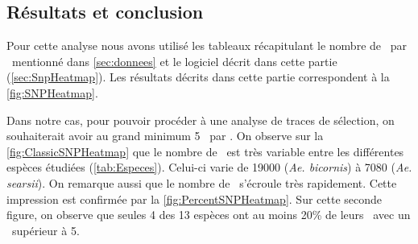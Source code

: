 \documentclass[../main]{subfiles} %
\begin{document}
\subsection{Résultats et conclusion}
\label{sec:SNP_Results}
Pour cette analyse nous avons utilisé les tableaux récapitulant le nombre de \SNP par \contig mentionné dans \ref{sec:donnees} et le logiciel décrit dans cette partie (\cref{sec:SnpHeatmap}). Les résultats décrits dans cette partie correspondent à la \cref{fig:SNPHeatmap}.

Dans notre cas, pour pouvoir procéder à une analyse de  traces de sélection, on souhaiterait avoir au grand minimum 5 \SNP par \contigs.
On observe sur la \cref{fig:ClassicSNPHeatmap} que le nombre de \contigs est très variable entre les différentes espèces étudiées (\ref{tab:Especes}). Celui-ci varie de \num{19 000} (\textit{Ae. bicornis}) à \num{7 080} (\textit{Ae. searsii}). On remarque aussi que le nombre de \SNP s'écroule très rapidement. Cette impression est confirmée par la \cref{fig:PercentSNPHeatmap}. Sur cette seconde figure, on observe que seules 4 des 13 espèces ont au moins 20\% de leurs \contigs avec un \NbSNP supérieur à \num{5}.


\end{document}
